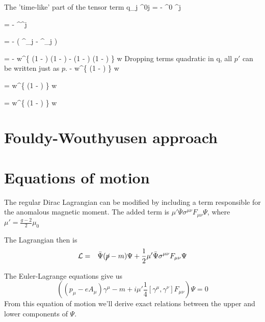 The 'time-like' part of the tensor term
\beq
	\srb  {} q_j \sigma^{0j} \sr
		=	 -  \srb \gamma^0 \gamma^j \sr 		
 \eeq
 
 \beq
 	=  -  \sr^\dagger \gamma^j \sr
 \eeq
 
 \beq
 	= -   \left( \eta^\dagger \sigma_j \chi - \chi^\dagger \sigma_j \eta \right )
 \eeq
 
\beq
	= -   w^\dagger \left \{
		\left(1 -  \right )   \left(1 -  \right )
		- \left(1 -  \right )  \left(1 -  \right )
	\right \} w
\eeq
Dropping terms quadratic in q, all $p'$ can be written just as $p$.
\beq
	\approx -   w^\dagger \left \{
		 \left(1 -  \right )
	\right \} w
\eeq		

\beq
	=    w^\dagger \left \{
		 \left(1 -  \right )
	\right \} w
\eeq

\beq
	=  w^\dagger \left \{
		 \left(1 -  \right )
	\right \} w
\eeq

			


 \section{Fouldy-Wouthyusen approach}
 
 

\section{Equations of motion}


The regular Dirac Lagrangian can be modified by including a term responsible for the anomalous magnetic moment.  The added term is $\mu' \bar{\Psi} \sigma^{\mu\nu}F_{\mu\nu} \Psi$, where $\mu' = \frac{g-2}{2}\mu_0$

The Lagrangian then is
\begin{eqnarray*}
\mathcal{L} &=&	
	\bar{\Psi}(\cancel{p} - m)\Psi + \frac{1}{2} \mu' \bar{\Psi} \sigma^{\mu\nu}F_{\mu\nu} \Psi	
\end{eqnarray*}

The Euler-Lagrange equations give us
\[
	\left( (p_\mu- eA_\mu)\gamma^\mu -m + i\mu' \frac{1}{4}[ \gamma^\mu, \gamma^\nu]F_{\mu\nu} \right) \Psi
		=0
\]
From this equation of motion we'll derive exact relations between the upper and lower components of $\Psi$.

